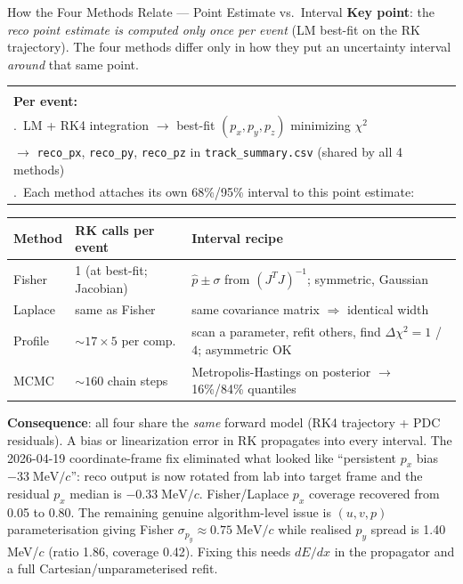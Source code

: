 \documentclass[aspectratio=169]{beamer}
\begin{document}
\begin{frame}{How the Four Methods Relate --- Point Estimate vs.\ Interval}
\small
\textbf{Key point}: the \emph{reco point estimate is computed only once per event} (LM best-fit on the RK trajectory). The four methods differ only in how they put an uncertainty interval \emph{around} that same point.

\vspace{0.15cm}
\begin{tabular}{@{}p{}@{}}
\hline\\[-0.7em]
\textbf{Per event:}\\
\quad 1.\ LM + RK4 integration $\rightarrow$ best-fit $(p_x, p_y, p_z)$ minimizing $\chi^2$\\
\quad\quad $\rightarrow$ \texttt{reco\_px}, \texttt{reco\_py}, \texttt{reco\_pz} in \texttt{track\_summary.csv} (shared by all 4 methods)\\[0.2em]
\quad 2.\ Each method attaches its own 68\%/95\% interval to this point estimate:\\[0.15em]
\hline
\end{tabular}

\vspace{0.1cm}
\begin{table}
\centering\footnotesize
\begin{tabular}{lll}
\toprule
Method & RK calls per event & Interval recipe \\
\midrule
Fisher  & 1 (at best-fit; Jacobian) & $\hat{p}\pm\sigma$ from $(J^TJ)^{-1}$; symmetric, Gaussian \\
Laplace & same as Fisher           & same covariance matrix $\Rightarrow$ identical width \\
Profile & $\sim\!17\times 5$ per comp. & scan a parameter, refit others, find $\Delta\chi^2{=}1$ / $4$; asymmetric OK \\
MCMC    & $\sim\!160$ chain steps   & Metropolis-Hastings on posterior $\rightarrow$ 16\%/84\% quantiles \\
\bottomrule
\end{tabular}
\end{table}

\textbf{Consequence}: all four share the \emph{same} forward model (RK4 trajectory + PDC residuals). A bias or linearization error in RK propagates into every interval. The 2026-04-19 coordinate-frame fix eliminated what looked like ``persistent $p_x$ bias $-33\;\mathrm{MeV}/c$'': reco output is now rotated from lab into target frame and the residual $p_x$ median is $-0.33\;\mathrm{MeV}/c$. Fisher/Laplace $p_x$ coverage recovered from 0.05 to 0.80. The remaining genuine algorithm-level issue is $(u,v,p)$ parameterisation giving Fisher $\sigma_{p_y}\!\approx\!0.75\;\mathrm{MeV}/c$ while realised $p_y$ spread is 1.40 MeV/$c$ (ratio 1.86, coverage 0.42). Fixing this needs $dE/dx$ in the propagator and a full Cartesian/unparameterised refit.
\end{frame}
\end{document}
